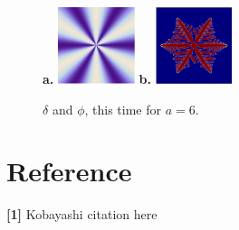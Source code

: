 \documentclass[10pt]{article} %
\begin{document}
\begin{figure}[h!]
  \centering
  \textbf{a. }\includegraphics[width=0.2\textwidth]{../radial-anisotropy-6.png}
  \hspace{1cm}\textbf{b. }\includegraphics[width=0.2\textwidth]{../anis-6.png}
  \caption{$\delta$ and $\phi$, this time for $a=6$.}
  \label{fig:r-delta-6}
\end{figure}

\section{Reference}
\textbf{[1]} Kobayashi citation here\\
\end{document}
